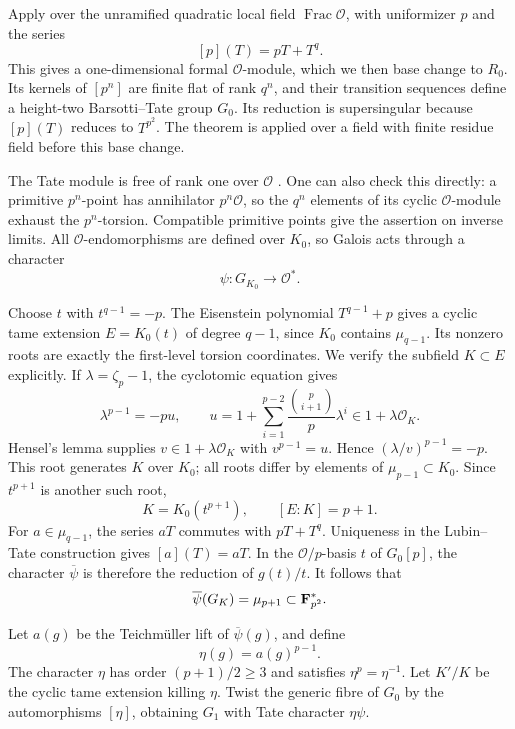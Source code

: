 Apply \citet[Lemma~1 and Theorem~1, pp.~381--382]{LT1965} over the unramified quadratic local field $\operatorname{Frac}\mathcal O$, with uniformizer $p$ and the series
\[
                         [p](T)=pT+T^q.
\]
This gives a one-dimensional formal $\mathcal O$-module, which we then base change to $R_0$. Its kernels of $[p^n]$ are finite flat of rank $q^n$, and their transition sequences define a height-two Barsotti--Tate group $G_0$. Its reduction is supersingular because $[p](T)$ reduces to $T^{p^2}$. The theorem is applied over a field with finite residue field before this base change.

The Tate module is free of rank one over $\mathcal O$ \citep[Theorem~2(b)--(d), pp.~383--384]{LT1965}. One can also check this directly: a primitive $p^n$-point has annihilator $p^n\mathcal O$, so the $q^n$ elements of its cyclic $\mathcal O$-module exhaust the $p^n$-torsion. Compatible primitive points give the assertion on inverse limits. All $\mathcal O$-endomorphisms are defined over $K_0$, so Galois acts through a character
\[
                       \psi:G_{K_0}\longrightarrow\mathcal O^*.
\]

Choose $t$ with $t^{q-1}=-p$. The Eisenstein polynomial $T^{q-1}+p$ gives a cyclic tame extension $E=K_0(t)$ of degree $q-1$, since $K_0$ contains $\mu_{q-1}$. Its nonzero roots are exactly the first-level torsion coordinates. We verify the subfield $K\subset E$ explicitly. If $\lambda=\zeta_p-1$, the cyclotomic equation gives
\[
 \lambda^{p-1}=-pu,\qquad
 u=1+\sum_{i=1}^{p-2}\frac{\binom p{i+1}}p\lambda^i
                      \in1+\lambda\mathcal O_K.
\]
Hensel's lemma supplies $v\in1+\lambda\mathcal O_K$ with $v^{p-1}=u$. Hence $(\lambda/v)^{p-1}=-p$. This root generates $K$ over $K_0$; all roots differ by elements of $\mu_{p-1}\subset K_0$. Since $t^{p+1}$ is another such root,
\[
                    K=K_0(t^{p+1}),\qquad [E:K]=p+1.
\]
For $a\in\mu_{q-1}$, the series $aT$ commutes with $pT+T^q$. Uniqueness in the Lubin--Tate construction gives $[a](T)=aT$. In the $\mathcal O/p$-basis $t$ of $G_0[p]$, the character $\overline\psi$ is therefore the reduction of $g(t)/t$. It follows that
\[
                 \overline\psi(G_K)=\mu_{p+1}\subset\mathbf F_{p^2}^*.
\]

Let $a(g)$ be the Teichm\"uller lift of $\overline\psi(g)$, and define
\[
                   \eta(g)=a(g)^{p-1}.
\]
The character $\eta$ has order $(p+1)/2\ge3$ and satisfies $\eta^p=\eta^{-1}$. Let $K'/K$ be the cyclic tame extension killing $\eta$. Twist the generic fibre of $G_0$ by the automorphisms $[\eta]$, obtaining $G_1$ with Tate character $\eta\psi$.

